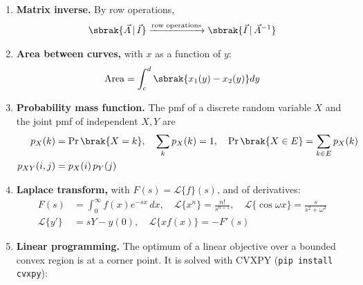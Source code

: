 \begin{enumerate}[label=\thesubsection.\arabic*, ref=\thesubsection.\theenumi, itemsep=0pt]
\begin{align}
\vec{n}^{\top}\brak{\vec{x}-\vec{p}} &= 0
\label{eq:EE26BTECH11225-plane} \\
\text{rank}\sbrak{\vec{B}-\vec{A} \ \ \vec{C}-\vec{A} \ \ \vec{D}-\vec{A}} &\leq 2
\label{eq:EE26BTECH11225-coplanar} \\
d &= \norm{\vec{w} - \frac{\vec{b}^{\top}\vec{w}}{\vec{b}^{\top}\vec{b}}\vec{b}}
\label{eq:EE26BTECH11225-distance-lines} \\
\vec{Q} &= \vec{P} + t\vec{n}, \quad \vec{P}' = \vec{P} + 2t\vec{n}
\label{eq:EE26BTECH11225-foot}
\end{align}
\item \textbf{Matrix inverse.} By row operations,
\begin{align}
\sbrak{\vec{A} \,|\, \vec{I}} \xrightarrow{\text{row operations}} \sbrak{\vec{I} \,|\, \vec{A}^{-1}}
\label{eq:EE26BTECH11225-rowops}
\end{align}
\item \textbf{Area between curves,} with $x$ as a function of $y$:
\begin{align}
\text{Area} = \int_c^d \sbrak{x_1(y) - x_2(y)}dy
\label{eq:EE26BTECH11225-area-curves-y}
\end{align}
\item \textbf{Probability mass function.} The pmf of a discrete random variable $X$ and the joint pmf of independent $X, Y$ are
\begin{align}
p_X(k) &= \Pr\brak{X = k}, \quad \sum_k p_X(k) = 1, \quad \Pr\brak{X \in E} = \sum_{k \in E}p_X(k)
\label{eq:12-pmf} \\
p_{XY}(i,j) &= p_X(i)\,p_Y(j)
\label{eq:12-pmf-sum}
\end{align}
\item \textbf{Laplace transform,} with $F(s) = \mathcal{L}\{f\}(s)$, and of derivatives:
\begin{align}
F(s) &= \int_0^\infty f(x)e^{-sx}\,dx, \quad \mathcal{L}\{x^n\} = \frac{n!}{s^{n+1}}, \quad \mathcal{L}\{\cos \omega x\} = \frac{s}{s^2+\omega^2}
\label{eq:EE26BTECH11225-laplace} \\
\mathcal{L}\{y'\} &= sY - y(0), \quad \mathcal{L}\{x f(x)\} = -F'(s)
\label{eq:EE26BTECH11225-laplace-deriv}
\end{align}
\item \textbf{Linear programming.} The optimum of a linear objective over a bounded convex region is at a corner point. It is solved with CVXPY (\texttt{pip install cvxpy}):
\begin{align}

\end{align}
\end{enumerate}
